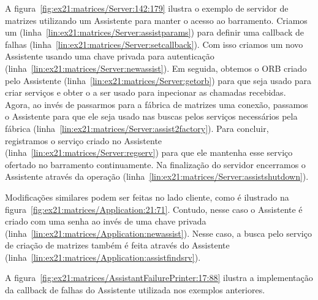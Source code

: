 A figura~\ref{fig:ex21:matrices/Server:142:179} ilustra o exemplo de servidor de matrizes utilizando um Assistente para manter o acesso ao barramento.
Criamos um  (linha~\ref{lin:ex21:matrices/Server:assistparams}) para definir uma callback de falhas (linha~\ref{lin:ex21:matrices/Server:setcallback}).
Com isso criamos um novo Assistente usando uma chave privada para autenticação (linha~\ref{lin:ex21:matrices/Server:newassist}).
Em seguida, obtemos o ORB criado pelo Assistente (linha~\ref{lin:ex21:matrices/Server:getorb}) para que seja usado para criar serviços e obter o  a ser usado para inpecionar as chamadas recebidas.
Agora, ao invés de passarmos para a fábrica de matrizes uma conexão, passamos o Assistente para que ele seja usado nas buscas pelos serviços necessários pela fábrica (linha~\ref{lin:ex21:matrices/Server:assist2factory}).
Para concluir, registramos o serviço criado no Assistente (linha~\ref{lin:ex21:matrices/Server:regserv}) para que ele mantenha esse serviço ofertado no barramento continuamente.
Na finalização do servidor encerramos o Assistente através da operação  (linha~\ref{lin:ex21:matrices/Server:assistshutdown}).


Modificações similares podem ser feitas no lado cliente, como é ilustrado na figura~\ref{fig:ex21:matrices/Application:21:71}.
Contudo, nesse caso o Assistente é criado com uma senha ao invés de uma chave privada (linha~\ref{lin:ex21:matrices/Application:newassist}).
Nesse caso, a busca pelo serviço de criação de matrizes também é feita através do Assistente (linha~\ref{lin:ex21:matrices/Application:assistfindsrv}).


A figura~\ref{fig:ex21:matrices/AssistantFailurePrinter:17:88} ilustra a implementação da callback de falhas do Assistente utilizada nos exemplos anteriores.


